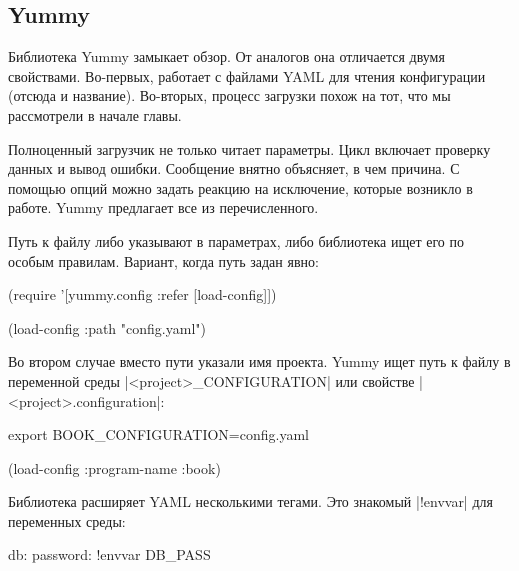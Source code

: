 \subsection{Yummy}


Библиотека Yummy замыкает обзор. От
аналогов она отличается двумя свойствами. Во-первых, работает с файлами YAML для
чтения конфигурации (отсюда и название). Во-вторых, процесс загрузки похож на
тот, что мы рассмотрели в начале главы.

Полноценный загрузчик не только читает параметры. Цикл включает проверку данных
и вывод ошибки. Сообщение внятно объясняет, в чем причина. С помощью опций можно
задать реакцию на исключение, которые возникло в работе. Yummy предлагает все из
перечисленного.

Путь к файлу либо указывают в параметрах, либо библиотека ищет его по особым
правилам. Вариант, когда путь задан явно:

\begin{english}
  \begin{clojure}
(require '[yummy.config :refer [load-config]])

(load-config {:path "config.yaml"})
  \end{clojure}
\end{english}

Во втором случае вместо пути указали имя проекта. Yummy ищет путь к файлу в
переменной среды \spverb|<project>_CONFIGURATION| или свойстве
\spverb|<project>.configuration|:

\begin{english}
  \begin{bash}
export BOOK_CONFIGURATION=config.yaml
  \end{bash}
\end{english}

\begin{english}
  \begin{clojure}
(load-config {:program-name :book})
  \end{clojure}
\end{english}

Библиотека расширяет YAML несколькими тегами. Это знакомый \spverb|!envvar|
для переменных среды:


\begin{english}
  \begin{yaml}
db:
  password: !envvar DB_PASS
  \end{yaml}
\end{english}

